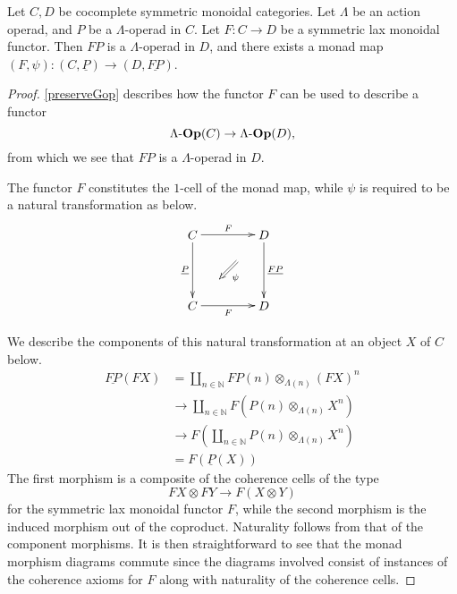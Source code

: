 \begin{prop}\label{monoidal_to_monadmap}
Let $C,D$ be cocomplete symmetric monoidal categories. Let $\Lambda$ be an action operad, and $P$ be a $\Lambda$-operad in $C$. Let $F \colon C \rightarrow D$ be a symmetric lax monoidal functor. Then $FP$ is a $\Lambda$-operad in $D$, and there exists a monad map $(F,\psi) \colon (C,\underline{P}) \rightarrow (D, \underline{FP})$.
\end{prop}
\begin{proof}
\cref{preserveGop} describes how the functor $F$ can be used to describe a functor
  \[
    \Lambda\mbox{-}\mathbf{Op}(C) \rightarrow \Lambda\mbox{-}\mathbf{Op}(D),
  \]
from which we see that $FP$ is a $\Lambda$-operad in $D$.

The functor $F$ constitutes the $1$-cell of the monad map, while $\psi$ is required to be a natural transformation as below.
  \[
    \xy
      (0,0)*+{C}="a";
      (20,0)*+{D}="b";
      (0,-20)*+{C}="c";
      (20,-20)*+{D}="d";
      {\ar^{F} "a" ; "b"};
      {\ar^{\underline{FP}} "b" ; "d"};
      {\ar_{\underline{P}} "a" ; "c"};
      {\ar_{F} "c" ; "d"};
      {\ar@{=>}^{\psi} (12.5, -7.5) ; (7.5,-12.5)};
    \endxy
  \]

We describe the components of this natural transformation at an object $X$ of $C$ below.
  \begin{align*}
    \underline{FP}(FX) &= \coprod_{n \in \mathbb{N}} FP(n) \otimes_{\Lambda(n)} (FX)^n \\
    &\rightarrow \coprod_{n \in \mathbb{N}} F\left(P(n) \otimes_{\Lambda(n)} X^n\right)\\
    &\rightarrow F\left(\coprod_{n \in \mathbb{N}} P(n) \otimes_{\Lambda(n)} X^n\right)\\
    &=F(\underline{P}(X))
  \end{align*}
The first morphism is a composite of the coherence cells of the type
  \[
    FX \otimes FY \rightarrow F(X \otimes Y)
  \]
for the symmetric lax monoidal functor $F$, while the second morphism is the induced morphism out of the coproduct. Naturality follows from that of the component morphisms. It is then straightforward to see that the monad morphism diagrams commute since the diagrams involved consist of instances of the coherence axioms for $F$ along with naturality of the coherence cells.
\end{proof}

